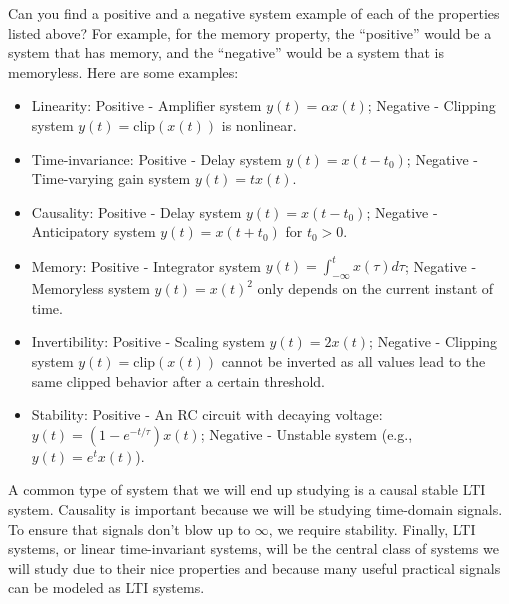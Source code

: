 \begin{popquiz}
  Can you find a positive and a negative system example of each of the properties listed above? For example, for the memory property, the ``positive'' would be a system that has memory, and the ``negative'' would be a system that is memoryless. 
  \popqsplit
  Here are some examples:
  \begin{itemize}
      \item Linearity: Positive - Amplifier system $y(t) = \alpha x(t)$; Negative - Clipping system $y(t) = \text{clip}(x(t))$ is nonlinear.
      \item Time-invariance: Positive - Delay system $y(t) = x(t - t_0)$; Negative - Time-varying gain system $y(t) = t x(t)$.
      \item Causality: Positive - Delay system $y(t) = x(t - t_0)$; Negative - Anticipatory system $y(t) = x(t + t_0)$ for $t_0 >0$.
      \item Memory: Positive - Integrator system $y(t) = \int_{-\infty}^{t} x(\tau) d\tau$; Negative - Memoryless system $y(t) = x(t)^2$ only depends on the current instant of time.
      \item Invertibility: Positive - Scaling system $y(t) = 2x(t)$; Negative - Clipping system $y(t) = \text{clip}(x(t))$ cannot be inverted as all values lead to the same clipped behavior after a certain threshold.
      \item Stability: Positive - An RC circuit with decaying voltage: $y(t) = (1 - e^{-t/\tau}) x(t)$; Negative - Unstable system (e.g., $y(t) = e^{t} x(t)$).
  \end{itemize} 
\end{popquiz}
A common type of system that we will end up studying is a causal stable LTI system. Causality is important because we will be studying time-domain signals. To ensure that signals don't blow up to $\infty$, we require stability. Finally, LTI systems, or linear time-invariant systems, will be the central class of systems we will study due to their nice properties and because many useful practical signals can be modeled as LTI systems.
